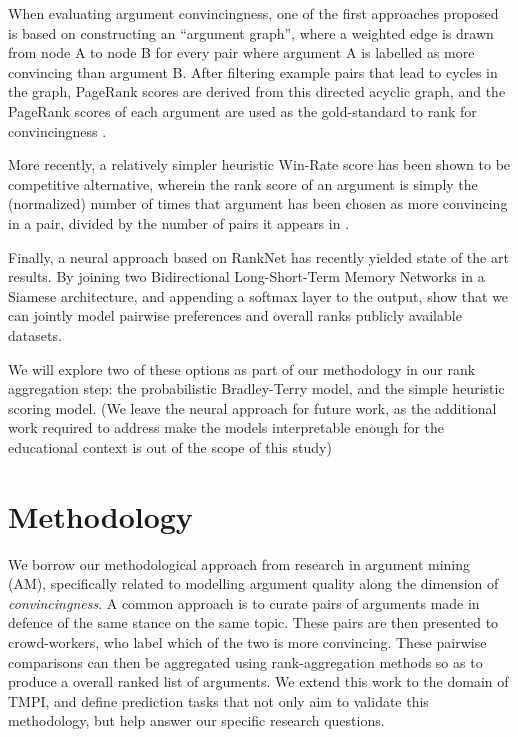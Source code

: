 \documentclass[sigconf]{acmart}
\begin{document}
When evaluating argument convincingness, one of the first approaches proposed 
is based on constructing an ``argument graph'', where a weighted edge is drawn 
from node A to node B for every pair where argument A is labelled as more 
convincing than argument B. 
After filtering example pairs that lead to cycles in the graph, PageRank scores 
are derived from this directed acyclic graph, and the PageRank 
scores of each argument are used as the gold-standard to rank for 
convincingness \cite{habernal_which_2016}.

More recently, a relatively simpler heuristic Win-Rate score has been shown to 
be competitive alternative, wherein the rank score of an argument is simply the 
(normalized) number of times that argument has been chosen as more convincing 
in a pair, divided by the number of pairs it appears in
\cite{potash_ranking_2019}.

Finally, a neural approach based on RankNet has recently yielded state of the 
art results. By joining two Bidirectional Long-Short-Term Memory Networks in a 
Siamese architecture, and appending a softmax layer to the output, 
\cite{gleize_are_2019} show that we can jointly model pairwise preferences and 
overall ranks publicly available datasets.

We will explore two of these options as part of our methodology in our rank 
aggregation step: the probabilistic Bradley-Terry model, and the simple 
heuristic scoring model. 
(We leave the neural approach for future work, as the additional work required 
to address make the models interpretable enough for the educational context is 
out of the scope of this study)


\section{Methodology}

We borrow our methodological approach from research in argument mining (AM), 
specifically related to modelling argument quality along the dimension of 
\textit{convincingness}.
A common approach is to curate pairs of arguments made in defence of the same 
stance on the same topic.
These pairs are then presented to crowd-workers, who label which of the two is 
more convincing. 
These pairwise comparisons can then be aggregated using rank-aggregation 
methods so as to produce a overall ranked list of arguments.
We extend this work to the domain of TMPI, and define prediction tasks that not 
only aim to validate this methodology, but help answer our specific research 
questions.
\end{document}

